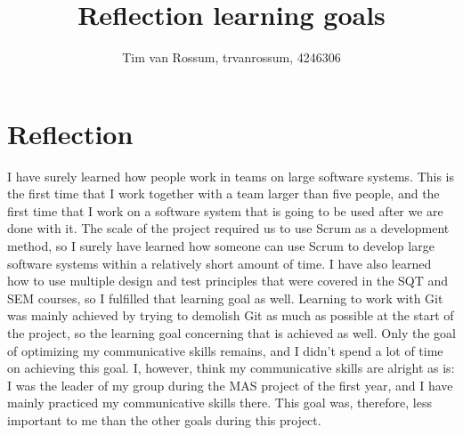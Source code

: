 \documentclass[]{article}
\title{Reflection learning goals}
\author{Tim van Rossum, trvanrossum, 4246306}
\begin{document}
\maketitle
\section*{Reflection}
I have surely learned how people work in teams on large software systems. This is the first time that I work together with a team larger than five people, and the first time that I work on a software system that is going to be used after we are done with it. The scale of the project required us to use Scrum as a development method, so I surely have learned how someone can use Scrum to develop large software systems within a relatively short amount of time. I have also learned how to use multiple design and test principles that were covered in the SQT and SEM courses, so I fulfilled that learning goal as well. Learning to work with Git was mainly achieved by trying to demolish Git as much as possible at the start of the project, so the learning goal concerning that is achieved as well. Only the goal of optimizing my communicative skills remains, and I didn't spend a lot of time on achieving this goal. I, however, think my communicative skills are alright as is: I was the leader of my group during the MAS project of the first year, and I have mainly practiced my communicative skills there. This goal was, therefore, less important to me than the other goals during this project. 
\end{document}
